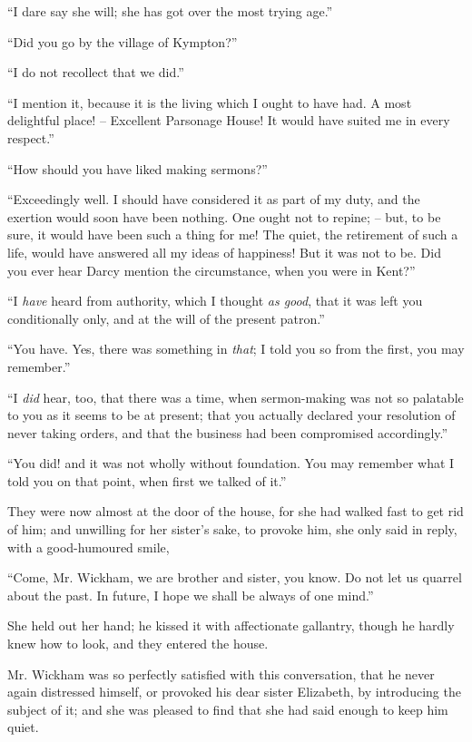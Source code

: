 “I dare say she will; she has got over the most trying
age.”

“Did you go by the village of Kympton?”

“I do not recollect that we did.”

“I mention it, because it is the living which I ought to
have had. A most delightful place! -- Excellent Parsonage
House! It would have suited me in every respect.”

“How should you have liked making sermons?”

“Exceedingly well. I should have considered it as part
of my duty, and the exertion would soon have been
nothing. One ought not to repine; -- but, to be sure, it
would have been such a thing for me! The quiet, the
retirement of such a life, would have answered all my
ideas of happiness! But it was not to be. Did you ever
hear Darcy mention the circumstance, when you were in
Kent?”

“I \textit{have} heard from authority, which I thought \textit{as good},
that it was left you conditionally only, and at the will
of the present patron.”

“You have. Yes, there was something in \textit{that}; I told
you so from the first, you may remember.”

“I \textit{did} hear, too, that there was a time, when sermon-making
was not so palatable to you as it seems to be at
present; that you actually declared your resolution of
never taking orders, and that the business had been
compromised accordingly.”

“You did! and it was not wholly without foundation.
You may remember what I told you on that point, when
first we talked of it.”

They were now almost at the door of the house, for
she had walked fast to get rid of him; and unwilling for
her sister’s sake, to provoke him, she only said in reply,
with a good-humoured smile,

“Come, Mr. Wickham, we are brother and sister, you
know. Do not let us quarrel about the past. In future,
I hope we shall be always of one mind.”

She held out her hand; he kissed it with affectionate
gallantry, though he hardly knew how to look, and they
entered the house.


Mr. Wickham was so perfectly satisfied with this conversation,
that he never again distressed himself, or
provoked his dear sister Elizabeth, by introducing the
subject of it; and she was pleased to find that she had
said enough to keep him quiet.

